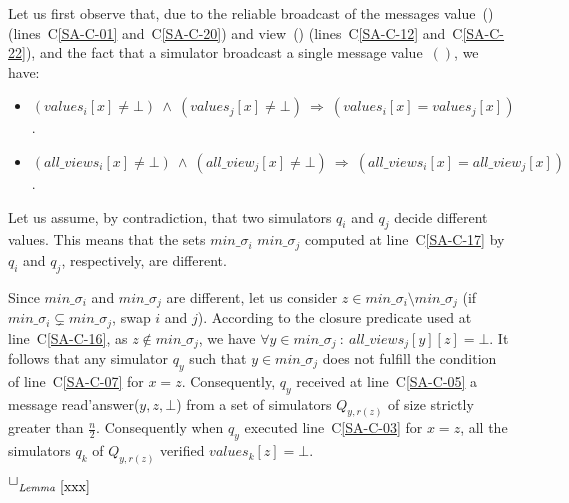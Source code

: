 \documentclass[11pt,letterpaper]{article}
\newlength {\afterproof}
\newcommand{\toto}{xxx}
\newenvironment{proofL}{\noindent{\bf Proof }}
{\hspace*{\fill}$\Box_{\mathit{Lemma}~\ref{\toto}}$\par\vspace{\afterproof}}
\begin{document}
\begin{proofL}
Let us first observe that, due to the reliable broadcast of the messages
{\sc value}~() (lines~C\ref{SA-C-01} and~C\ref{SA-C-20})  and
{\sc view}~() (lines~C\ref{SA-C-12} and~C\ref{SA-C-22}), 
and the fact that a simulator broadcast a single message {\sc value}~$()$, 
we have:
\begin{itemize}
\vspace{-0.2cm}
\item $(values_i[x]\neq \bot) ~\wedge~(values_j[x]\neq \bot)
      ~\Rightarrow~(values_i[x]=values_j[x])$.
\vspace{-0.2cm}
\item $(all\_views_i[x]\neq \bot) ~\wedge~(all\_view_j[x]\neq \bot)
      ~\Rightarrow~(all\_views_i[x]=all\_view_j[x])$.
\end{itemize}

Let us assume, by contradiction, that two simulators $q_i$ and $q_j$
decide different values. This means that the sets  $min\_\sigma_i$
 $min\_\sigma_j$ computed at line~C\ref{SA-C-17} by   $q_i$  and  $q_j$,
respectively,  are different.

Since $min\_\sigma_i$ and $min\_\sigma_j$ are different,
let us consider $z\in min\_\sigma_i\setminus min\_\sigma_j$
(if $min\_\sigma_i \subsetneq min\_\sigma_j$,  swap $i$ and $j$).
According to the closure predicate used at line~C\ref{SA-C-16},
as $z\notin min\_\sigma_j$,
we have  $\forall y\in min\_\sigma_j~:~all\_views_j[y][z]=\bot$.
It follows that any simulator $q_y$ such that $y\in min\_\sigma_j$ does not
fulfill the condition of line~C\ref{SA-C-07} for  $x=z$.
Consequently, $q_y$ received at line~C\ref{SA-C-05} a message
{\sc read'answer}($y,z,\bot$)
from a set of simulators $Q_{y,r(z)}$ of size strictly greater
than $\frac{n}{2}$.
Consequently when $q_y$ executed line~C\ref{SA-C-03} for $x=z$, all the
simulators $q_k$ of $Q_{y,r(z)}$ verified $values_k[z]=\bot$.


\end{proofL}
\end{document}
